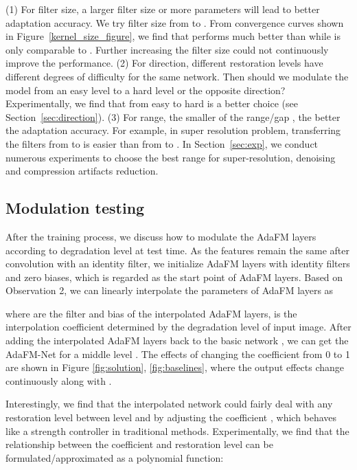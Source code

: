 \documentclass[10pt,twocolumn,letterpaper]{article}
\begin{document}
(1) For filter size, a larger filter size or more parameters will lead to better adaptation accuracy. We try filter size from  to . From convergence curves shown in Figure~\ref{kernel_size_figure}, we find that  performs much better than  while  is only comparable to . Further increasing the filter size could not continuously improve the performance. 
(2) For direction, different restoration levels have different degrees of difficulty for the same network. Then should we modulate the model from an easy level to a hard level or the opposite direction? Experimentally, we find that from easy to hard is a better choice (see Section~\ref{sec:direction}). 
(3) For range, the smaller of the range/gap , the better the adaptation accuracy. For example, in super resolution problem, transferring the filters from  to  is easier than from  to . In Section~\ref{sec:exp}, we conduct numerous experiments to choose the best range for super-resolution, denoising and compression artifacts reduction. 


\subsection{Modulation testing}
\label{sec:test}
After the training process, we discuss how to modulate the AdaFM layers according to degradation level at test time. As the features remain the same after convolution with an identity filter, we initialize AdaFM layers with identity filters  and zero biases, which is regarded as the start point of AdaFM layers. Based on Observation 2, we can linearly interpolate the parameters of AdaFM layers as

where  are the filter and bias of the interpolated AdaFM layers,  is the interpolation coefficient determined by the degradation level of input image. After adding the interpolated AdaFM layers back to the basic network , we can get the AdaFM-Net  for a middle level . The effects of changing the coefficient  from 0 to 1 are shown in Figure \ref{fig:solution}, \ref{fig:baselines}, where the output effects change continuously along with . 

Interestingly, we find that the interpolated network could fairly deal with any restoration level  between level  and  by adjusting the coefficient , which behaves like a strength controller in traditional methods. Experimentally, we find that the relationship between the coefficient  and restoration level  can be formulated/approximated as a polynomial function:
\vspace{-1em}
\end{document}
